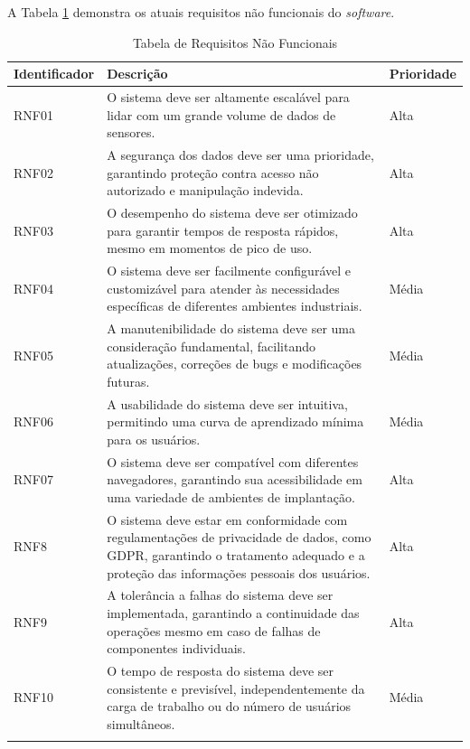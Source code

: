 A Tabela \ref{tab:ReqNaoFuncional} demonstra os atuais requisitos não funcionais do \textit{software}.

{\fontsize{10}{12}\selectfont \begin{longtable}
{| p{} | p{} | p{} |} 
    \hline
    \textbf{Identificador} & \textbf{Descrição} & \textbf{Prioridade} \\
    \hline
    RNF01 & O sistema deve ser altamente escalável para lidar com um grande volume de dados de sensores. & Alta \\
    \hline
    RNF02 & A segurança dos dados deve ser uma prioridade, garantindo proteção contra acesso não autorizado e manipulação indevida. & Alta \\
    \hline
    RNF03 & O desempenho do sistema deve ser otimizado para garantir tempos de resposta rápidos, mesmo em momentos de pico de uso. & Alta \\
    \hline
    RNF04 & O sistema deve ser facilmente configurável e customizável para atender às necessidades específicas de diferentes ambientes industriais. & Média \\
    \hline
    RNF05 & A manutenibilidade do sistema deve ser uma consideração fundamental, facilitando atualizações, correções de bugs e modificações futuras. & Média \\
    \hline
    RNF06 & A usabilidade do sistema deve ser intuitiva, permitindo uma curva de aprendizado mínima para os usuários. & Média \\
    \hline
    RNF07 & O sistema deve ser compatível com diferentes navegadores, garantindo sua acessibilidade em uma variedade de ambientes de implantação. & Alta \\
    \hline
    RNF8 & O sistema deve estar em conformidade com regulamentações de privacidade de dados, como GDPR, garantindo o tratamento adequado e a proteção das informações pessoais dos usuários. & Alta \\
    \hline
    RNF9 & A tolerância a falhas do sistema deve ser implementada, garantindo a continuidade das operações mesmo em caso de falhas de componentes individuais. & Alta \\
    \hline
    RNF10 & O tempo de resposta do sistema deve ser consistente e previsível, independentemente da carga de trabalho ou do número de usuários simultâneos. & Média \\
    \hline
\caption{Tabela de Requisitos Não Funcionais} %
\label{tab:ReqNaoFuncional}
\end{longtable}}

